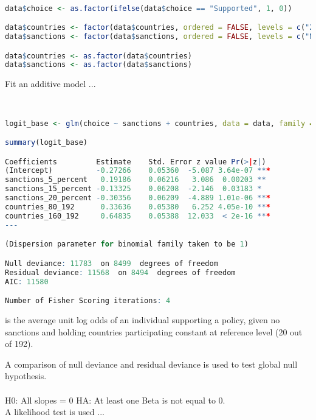 \documentclass[12pt,letterpaper]{article}
\begin{document}
\begin{lstlisting}[language=R]

data$choice <- as.factor(ifelse(data$choice == "Supported", 1, 0))

data$countries <- factor(data$countries, ordered = FALSE, levels = c("20 of 192", "80 of 192", "160 of 192"), labels = c("_20_192", "_80_192", "_160_192"))
data$sanctions <- factor(data$sanctions, ordered = FALSE, levels = c("None", "5%", "15%", "20%"), labels = c("none", "_5_percent", "_15_percent", "_20_percent"))

data$countries <- as.factor(data$countries)
data$sanctions <- as.factor(data$sanctions)

 \end{lstlisting}

\noindent Fit an additive model ...


\

\begin{lstlisting}[language=R]
logit_base <- glm(choice ~ sanctions + countries, data = data, family = binomial(link = "logit"))

summary(logit_base)

Coefficients	  	 Estimate    Std. Error z value Pr(>|z|)    
(Intercept)          -0.27266    0.05360  -5.087 3.64e-07 ***
sanctions_5_percent   0.19186    0.06216   3.086  0.00203 ** 
sanctions_15_percent -0.13325    0.06208  -2.146  0.03183 *  
sanctions_20_percent -0.30356    0.06209  -4.889 1.01e-06 ***
countries_80_192      0.33636    0.05380   6.252 4.05e-10 ***
countries_160_192     0.64835    0.05388  12.033  < 2e-16 ***
---

(Dispersion parameter for binomial family taken to be 1)

Null deviance: 11783  on 8499  degrees of freedom
Residual deviance: 11568  on 8494  degrees of freedom
AIC: 11580

Number of Fisher Scoring iterations: 4
 \end{lstlisting}
 
 is the average unit log odds of an individual supporting a policy, given no sanctions and holding countries participating constant at reference level (20 out of 192). 

\newpage

\noindent A comparison of null deviance and residual deviance is used to test global null hypothesis.\\ 
\\
\noindent H0: All slopes = 0 \newline
HA: At least one Beta is not equal to 0.\\
\newline
\noindent A likelihood test is used ...
 
\end{document}
